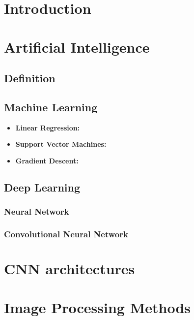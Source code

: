 \section{Introduction}
\vspace{0.2in}
\hspace*{0.16in}


\section{Artificial Intelligence}
\subsection{Definition}

\subsection{Machine Learning}

\begin{itemize}
  \item \textbf{Linear Regression:}
  \item \textbf{Support Vector Machines:}
  \item \textbf{Gradient Descent:}
\end{itemize}

\subsection{Deep Learning}
\subsubsection{Neural Network}
\subsubsection{Convolutional Neural Network}

\section{CNN architectures}
\vspace{0.2in}
\hspace*{0.16in}

\section{Image Processing Methods}
\vspace{0.2in}
\hspace*{0.16in}
